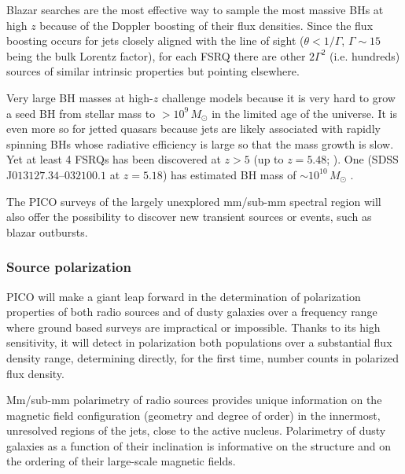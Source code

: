 \documentclass[PICOReport.tex]{subfiles}
\begin{document}
Blazar searches are the most effective way to sample the most massive BHs at
high $z$ because of the Doppler boosting of their flux densities. Since the
flux boosting occurs for jets closely aligned with the line of sight ($\theta <
1/\Gamma$, $\Gamma \sim 15$ being the bulk Lorentz factor), for each FSRQ there
are other $2\Gamma^2$  (i.e. hundreds) sources of similar intrinsic properties
but pointing elsewhere.

Very large BH masses at high-$z$ challenge models because it is very hard to
grow a seed BH from stellar mass to $> 10^9\,M_\odot$ in the limited age of the
universe. It is even more so for jetted quasars because jets are likely
associated with rapidly spinning BHs whose radiative efficiency is large so
that the mass growth is slow. Yet at least 4 FSRQs has been discovered at $z>5$
(up to $z=5.48$; \cite{Romani2004}). One (SDSS J$013127.34–032100.1$ at $z =
5.18$) has estimated BH mass of $\sim 10^{10}\,M_\odot$ \cite{Ghisellini2015}.

The PICO surveys of the largely unexplored mm/sub-mm spectral region will also
offer the possibility to discover new transient sources \cite{Metzger2015} or
events, such as blazar outbursts.


\subsubsection{Source polarization}

PICO will make a giant leap forward in the determination of polarization
properties of both radio sources and of dusty galaxies over a frequency range
where ground based surveys are impractical or impossible. Thanks to its high
sensitivity, it will detect in polarization both populations  over a
substantial flux density range, determining directly, for the first time,
number counts in polarized flux density.

Mm/sub-mm polarimetry of radio sources provides unique information on the
magnetic  field configuration (geometry and degree of order) in the innermost,
unresolved regions of the jets, close to the active nucleus. Polarimetry of
dusty galaxies as a function of their inclination is informative on the
structure and on the ordering of their large-scale magnetic fields.
\end{document}
